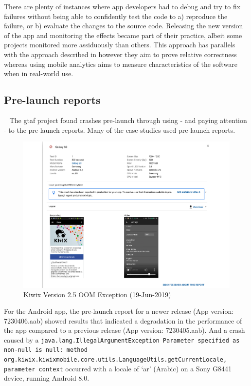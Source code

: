 There are plenty of instances where app developers had to debug and try to fix failures without being able to confidently test the code to a) reproduce the failure, or b) evaluate the changes to the source code. Releasing the new version of the app and monitoring the effects became part of their practice, albeit some projects monitored more assiduously than others. This approach has parallels with the approach described in  however they aim to prove relative correctness whereas using mobile analytics aims to measure characteristics of the software when in real-world use.

\subsection{Pre-launch reports}~\label{aiu-pre-launch-reports}
The \Gls{gtaf} project found crashes pre-launch through using - and paying attention - to the pre-launch reports. Many of the case-studies used pre-launch reports. 

\begin{figure}
    \centering
    \includegraphics[width=\linewidth]{images/google-play-console/Pre-launch_report_Galaxy_S3_OOM_Exception_Details_(19-Jun-2019).pdf}
    \caption{Kiwix Version 2.5 OOM Exception (19-Jun-2019)}
    \label{fig:pre-launch-report-kiwix-oom-also-in-production}
\end{figure}

For the  Android app, the pre-launch report for a newer release (App version: 7230406.aab) showed results that indicated a degradation in the performance of the app compared to a previous release (App version: 7230405.aab). And a crash caused by a \texttt{java.lang.IllegalArgumentException Parameter specified as non-null is null: method org.kiwix.kiwixmobile.core.utils.LanguageUtils.getCurrentLocale, parameter context} occurred with a locale of `ar' (Arabic) on a Sony G8441 device, running Android 8.0.

